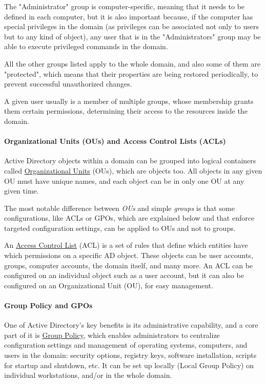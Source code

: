 The "Administrator" group is computer-specific, meaning that it needs to be defined in each computer, but it is also important because, if the computer has special privileges in the domain (as privileges can be associated not only to users but to any kind of object), any user that is in the "Administrators" group may be able to execute privileged commands in the domain.

\pagebreak
All the other groups listed apply to the whole domain, and also some of them are "protected", which means that their properties are being restored periodically, to prevent successful unauthorized changes.

A given user usually is a member of multiple groups, whose membership grants them certain permissions, determining their access to the resources inside the domain.

\paragraph{Organizational Units (OUs) and Access Control Lists (ACLs)}
Active Directory objects within a domain can be grouped into logical containers called \underline{Organizational Units} (OUs), which are objects too. All objects in any given OU must have unique names, and each object can be in only one OU at any given time.

The most notable difference between \textit{OUs} and simple \textit{groups} is that some configurations, like ACLs or GPOs, which are explained below and that enforce targeted configuration settings, can be applied to OUs and not to groups.

An \underline{Access Control List} (ACL) is a set of rules that define which entities have which permissions on a specific AD object. These objects can be user accounts, groups, computer accounts, the domain itself, and many more. An ACL can be configured on an individual object such as a user account, but it can also be configured on an Organizational Unit (OU), for easy management.

\paragraph{Group Policy and GPOs}

One of Active Directory's key benefits is its administrative capability, and a core part of it is \underline{Group Policy}, which enables administrators to centralize configuration settings and management of operating systems, computers, and users in the domain: security options, registry keys, software installation, scripts for startup and shutdown, etc. It can be set up locally (Local Group Policy) on individual workstations, and/or in the whole domain.

